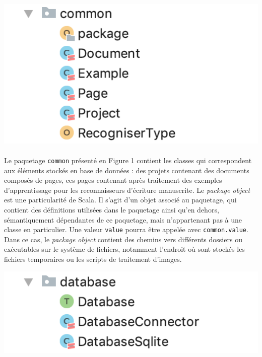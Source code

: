 \begin{mdframed}[frametitle={Figure 1 : Paquetage \texttt{common}}, innerbottommargin=10]
\begin{center}
\includegraphics[scale=0.7]{assets/common.png}
\end{center}
\end{mdframed}

\paragraph{}
Le paquetage \texttt{common} présenté en Figure 1 contient les classes qui correspondent aux éléments stockés en base de données : des projets contenant des documents composés de pages, ces pages contenant après traitement des exemples d'apprentissage pour les reconnaisseurs d'écriture manuscrite. Le \textit{package object} est une particularité de Scala. Il s'agit d'un objet associé au paquetage, qui contient des définitions utilisées dans le paquetage ainsi qu'en dehors, sémantiquement dépendantes de ce paquetage, mais n'appartenant pas à une classe en particulier. Une valeur \texttt{value} pourra être appelée avec \texttt{common.value}. Dans ce cas, le \textit{package object} contient des chemins vers différents dossiers ou exécutables sur le système de fichiers, notamment l'endroit où sont stockés les fichiers temporaires ou les scripts de traitement d'images.

\begin{mdframed}[frametitle={Figure 1 : Paquetage \texttt{database}}, innerbottommargin=10]
\begin{center}
\includegraphics[scale=0.7]{assets/database.png}
\end{center}
\end{mdframed}


